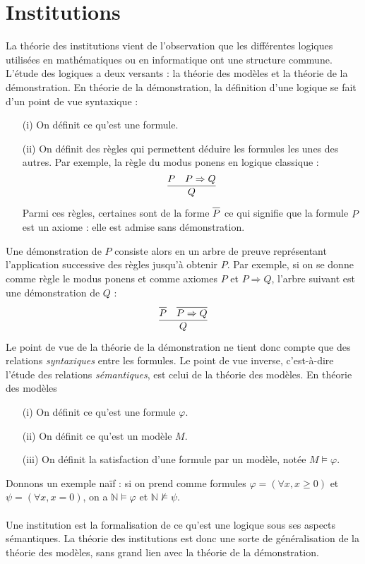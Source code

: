 \documentclass[11pt,a4paper]{report}
\newcommand{\ph}{\varphi}
\newcommand{\il}{\textit}
\newcommand{\N}{\mathbb{N}}
\newcommand{\1}{\mathbbm{1}}
\begin{document}
\section{Institutions}
La théorie des institutions vient de l'observation que les différentes logiques utilisées en mathématiques ou en informatique ont une structure commune. L'étude des logiques a deux versants : la théorie des modèles et la théorie de la démonstration. En théorie de la démonstration, la définition d'une logique se fait d'un point de vue syntaxique :
\begin{itemize}
\setlength\itemsep{-0.3em}
\item[(i)] On définit ce qu'est une formule.
\item[(ii)] On définit des règles qui permettent déduire les formules les unes des autres. Par exemple, la règle du modus ponens en logique classique :
$$\infer{Q}{P & P \Rightarrow Q}$$
Parmi ces règles, certaines sont de la forme $ \infer{P}{}$ ce qui signifie que la formule $P$ est un axiome : elle est admise sans démonstration.
\end{itemize}
Une démonstration de $P$ consiste alors en un arbre de preuve représentant l'application successive des règles jusqu'à obtenir $P$. Par exemple, si on se donne comme règle le modus ponens et comme axiomes $P$ et $P \Rightarrow Q$, l'arbre suivant est une démonstration de $Q$ :
$$ \infer{Q}{\infer{P}{} & \infer{P\Rightarrow Q}{}} $$
Le point de vue de la théorie de la démonstration ne tient donc compte que des relations \il{syntaxiques} entre les formules. Le point de vue inverse, c'est-à-dire l'étude des relations \il{sémantiques}, est celui de la théorie des modèles. En théorie des modèles
\begin{itemize}
\setlength\itemsep{-0.3em}
\item[(i)] On définit ce qu'est une formule $\ph$.
\item[(ii)] On définit ce qu'est un modèle $M$.
\item[(iii)] On définit la satisfaction d'une formule par un modèle, notée $M \models \ph$.
\end{itemize}
Donnons un exemple naïf : si on prend comme formules $\ph = (\forall x, x \geq 0)$ et $\psi = (\forall x, x = 0)$, on a $\N \models \ph$ et $\N \not\models \psi$.\\\\
Une institution est la formalisation de ce qu'est une logique sous ses aspects sémantiques. La théorie des institutions est donc une sorte de généralisation de la théorie des modèles, sans grand lien avec la théorie de la démonstration.
\end{document}
